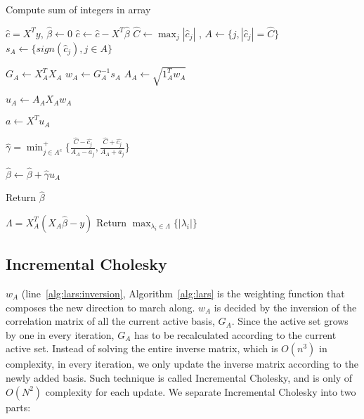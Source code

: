 \begin{algorithm}
	\caption{Compute sum of integers in array}
	\label{alg:lars}
	\begin{algorithmic}[1]
		    \State $\hat{c} = X^T y$, $\hat{\beta} \gets 0$ \label{alg:lars:initailize_correlation}
		      \State $\hat{c} \gets \hat{c} - X^T \hat{\beta}$ \label{alg:lars:get_active_idx}
		      \State $\hat{C} \gets \max_j{|\hat{c}_j|}$
		      , $A \gets \{j, |\hat{c}_j| = \hat{C} \}$
		      \State $s_A \gets \{sign(\hat{c}_j), j \in A\}$ \label{alg:lars:get_active_idx_end}
		      
		      \State $G_A \gets X_A^T X_A$ \label{alg:lars:cholesky}
		      \State $w_A \gets G_A^{-1} s_A$
		      \label{alg:lars:inversion}
		      \State $A_A \gets \sqrt{1_A^T w_A}$ \label{alg:lars:cholesky_end}
		      
		      \State $u_A \gets A_A X_A w_A$ \label{alg:lars:get_u}
		      
		      \State $a \gets X^T u_A$ \label{alg:lars:get_a}

		      \State $\hat{\gamma} = \min_{j \in A^c}^+ \Big\{ \frac{\hat{C} - \hat{c_j}}{A_A - a_j},  \frac{\hat{C} + \hat{c_j}}{A_A + a_j}\Big\}$ \label{alg:lars:get_gamma}
		      
		      \State $\hat{\beta} \gets \hat{\beta} + \hat{\gamma} u_A$ \label{alg:lars:update_beta}
		    
		    \EndWhile
            \State Return $\hat{\beta}$
		\EndProcedure
		
		\label{alg:lars:compute_lambda}
		    \State $\Lambda = X_A^T ( X_A \hat{\beta} - y)$
    		\State Return $\max_{\lambda_i \in \Lambda} \big\{ |\lambda_i| \big\}$ 
		\EndProcedure
	\end{algorithmic}
\end{algorithm}


\subsection{Incremental Cholesky}
\label{ssec:cholesky}
$w_A$ (line~\ref{alg:lars:inversion}, Algorithm~\ref{alg:lars} is the weighting function that composes the new direction to march along.
$w_A$ is decided by the inversion of the correlation matrix of all the current active basis, $G_A$.
Since the active set grows by one in every iteration, $G_A$ has to be recalculated according to the current active set.
Instead of solving the entire inverse matrix, which is $O(n^3)$ in complexity, in every iteration,
we only update the inverse matrix according to the newly added basis.
Such technique is called Incremental Cholesky, and is only of $O(N^2)$ complexity for each update.
We separate Incremental Cholesky into two parts: 

